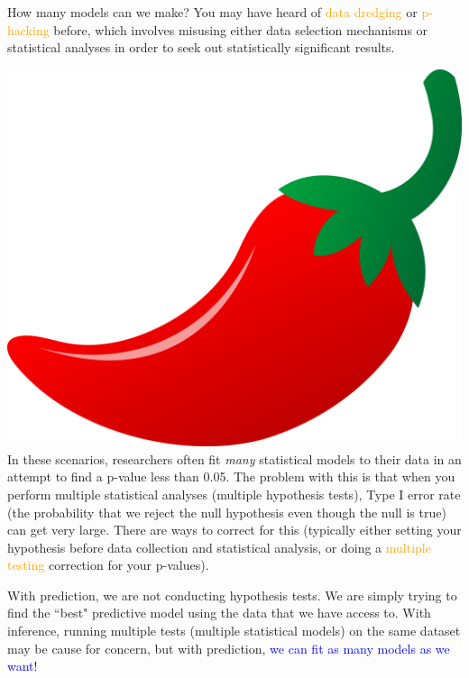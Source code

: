 \documentclass[10pt,t]{beamer}
\begin{document}
\begin{frame}{How many models can we make?}
\vspace{-0.5cm}
You may have heard of \textcolor{orange}{data dredging} or \textcolor{orange}{p-hacking} before, which involves misusing either data selection mechanisms or statistical analyses in order to seek out statistically significant results.

\vspace{0.3cm}

\includegraphics[scale=0.01]{chilipepper.png} In these scenarios, researchers often fit \textit{many} statistical models to their data in an attempt to find a p-value less than 0.05. The problem with this is that when you perform multiple statistical analyses (multiple hypothesis tests), Type I error rate (the probability that we reject the null hypothesis even though the null is true) can get very large. There are ways to correct for this (typically either setting your hypothesis before data collection and statistical analysis, or doing a \textcolor{orange}{multiple testing} correction for your p-values). 

\vspace{0.3cm}

With prediction, we are not conducting hypothesis tests. We are simply trying to find the ``best" predictive model using the data that we have access to. With inference, running multiple tests (multiple statistical models) on the same dataset may be cause for concern, but with prediction, \textcolor{blue}{we can fit as many models as we want!}

\end{frame}
\end{document}
